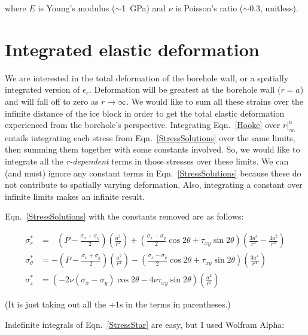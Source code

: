 \documentclass[11pt]{article}
\begin{document}
\noindent where $E$ is Young's modulus ($\sim$1~GPa) and $\nu$ is Poisson's ratio ($\sim$0.3, unitless).

\section*{Integrated elastic deformation}

We are interested in the total deformation of the borehole wall, or a spatially integrated version of $\epsilon_r$.  Deformation will be greatest at the borehole wall ($r=a$) and will fall off to zero as $r \rightarrow \infty$.  We would like to sum all these strains over the infinite distance of the ice block in order to get the total elastic deformation experienced from the borehole's perspective.  Integrating Eqn.~\ref{Hooke} over $r|_\infty^a$ entails integrating each stress from Eqn.~\ref{StressSolutions} over the same limits, then summing them together with some constants involved.  So, we would like to integrate all the \textit{r-dependent} terms in those stresses over these limits.  We can (and must) ignore any constant terms in Eqn.~\ref{StressSolutions} because these do not contribute to spatially varying deformation.  Also, integrating a constant over infinite limits makes an infinite result.

Eqn.~\ref{StressSolutions} with the constants removed are as follows:

\begin{equation}
	\begin{aligned}
	\sigma^*_r &= ~~~\left(P -  \frac{\sigma_x+\sigma_y}{2} \right)\left(\frac{a^2}{r^2}\right) + \left( \frac{\sigma_x-\sigma_y}{2}  \cos2\theta + \tau_{xy}\sin2\theta \right) \left(\frac{3a^4}{r^4}-\frac{4a^2}{r^2}\right)   \\
	\sigma^*_\theta &= - \left( P - \frac{\sigma_x+\sigma_y}{2}  \right) \left(\frac{a^2}{r^2}\right) - \left( \frac{\sigma_x-\sigma_y}{2} \cos2\theta + \tau_{xy}\sin2\theta \right) \left(\frac{3a^4}{r^4}\right)  \\
	\sigma^*_z &= \left( -2\nu\left(\sigma_x-\sigma_y\right)\cos2\theta - 4\nu\tau_{xy}\sin2\theta \right)  \left(\frac{a^2}{r^2} \right) 
	\end{aligned}
\label{StressStar}
\end{equation}

\noindent (It is just taking out all the $+1$s in the terms in parentheses.)

Indefinite integrals of Eqn.~\ref{StressStar} are easy, but I used Wolfram Alpha:
\end{document}
